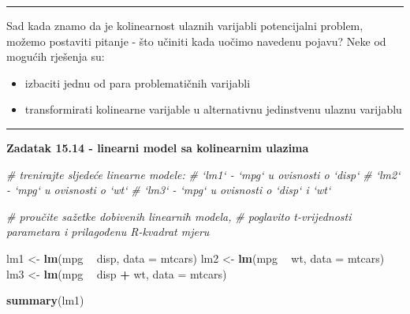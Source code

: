\documentclass[]{book}
\newenvironment{Shaded}{\begin{snugshade}}{\end{snugshade}}
\newcommand{\KeywordTok}[1]{\textcolor[rgb]{0.13,0.29,0.53}{\textbf{#1}}}
\newcommand{\DataTypeTok}[1]{\textcolor[rgb]{0.13,0.29,0.53}{#1}}
\newcommand{\StringTok}[1]{\textcolor[rgb]{0.31,0.60,0.02}{#1}}
\newcommand{\CommentTok}[1]{\textcolor[rgb]{0.56,0.35,0.01}{\textit{#1}}}
\newcommand{\OperatorTok}[1]{\textcolor[rgb]{0.81,0.36,0.00}{\textbf{#1}}}
\newcommand{\NormalTok}[1]{#1}
\providecommand{\tightlist}{%
  \setlength{\itemsep}{0pt}\setlength{\parskip}{0pt}}
\theoremstyle{definition}
\theoremstyle{definition}
\theoremstyle{definition}
\theoremstyle{remark}
\begin{document}
\begin{center}\rule{0.5\linewidth}{\linethickness}\end{center}

Sad kada znamo da je kolinearnost ulaznih varijabli potencijalni
problem, možemo postaviti pitanje - što učiniti kada uočimo navedenu
pojavu? Neke od mogućih rješenja su:

\begin{itemize}
\tightlist
\item
  izbaciti jednu od para problematičnih varijabli
\item
  transformirati kolinearne varijable u alternativnu jedinstvenu ulaznu
  varijablu
\end{itemize}

\begin{center}\rule{0.5\linewidth}{\linethickness}\end{center}

\textbf{Zadatak 15.14 - linearni model sa kolinearnim ulazima}

\begin{Shaded}
\begin{Highlighting}[]
\CommentTok{# trenirajte sljedeće linearne modele:}
\CommentTok{#  `lm1` - `mpg` u ovisnosti o `disp`}
\CommentTok{#  `lm2` - `mpg` u ovisnosti o `wt`}
\CommentTok{#  `lm3` - `mpg` u ovisnosti o `disp` i `wt`}

\CommentTok{# proučite sažetke dobivenih linearnih modela,}
\CommentTok{# poglavito t-vrijednosti parametara i prilagođenu R-kvadrat mjeru}
\end{Highlighting}
\end{Shaded}

\begin{Shaded}
\begin{Highlighting}[]
\NormalTok{lm1 <-}\StringTok{ }\KeywordTok{lm}\NormalTok{(mpg }\OperatorTok{~}\StringTok{ }\NormalTok{disp, }\DataTypeTok{data =}\NormalTok{ mtcars)}
\NormalTok{lm2 <-}\StringTok{ }\KeywordTok{lm}\NormalTok{(mpg }\OperatorTok{~}\StringTok{ }\NormalTok{wt, }\DataTypeTok{data =}\NormalTok{ mtcars)}
\NormalTok{lm3 <-}\StringTok{ }\KeywordTok{lm}\NormalTok{(mpg }\OperatorTok{~}\StringTok{ }\NormalTok{disp }\OperatorTok{+}\StringTok{ }\NormalTok{wt, }\DataTypeTok{data =}\NormalTok{ mtcars)}
\end{Highlighting}
\end{Shaded}

\begin{Shaded}
\begin{Highlighting}[]
\KeywordTok{summary}\NormalTok{(lm1)}
\end{Highlighting}
\end{Shaded}
\end{document}
